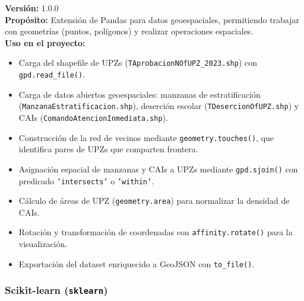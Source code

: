 \documentclass[12pt,a4paper]{article}
\begin{document}
\textbf{Versión:} 1.0.0\\
\textbf{Propósito:} Extensión de Pandas para datos geoespaciales, permitiendo trabajar con geometrías (puntos, polígonos) y realizar operaciones espaciales.\\
\textbf{Uso en el proyecto:}
\begin{itemize}
    \item Carga del shapefile de UPZs (\texttt{TAprobacionNOfUPZ\_2023.shp}) con \texttt{gpd.read\_file()}.
    \item Carga de datos abiertos geoespaciales: manzanas de estratificación (\texttt{ManzanaEstratificacion.shp}), deserción escolar (\texttt{TDesercionOfUPZ.shp}) y CAIs (\texttt{ComandoAtencionInmediata.shp}).
    \item Construcción de la red de vecinos mediante \texttt{geometry.touches()}, que identifica pares de UPZs que comparten frontera.
    \item Asignación espacial de manzanas y CAIs a UPZs mediante \texttt{gpd.sjoin()} con predicado \texttt{'intersects'} o \texttt{'within'}.
    \item Cálculo de áreas de UPZ (\texttt{geometry.area}) para normalizar la densidad de CAIs.
    \item Rotación y transformación de coordenadas con \texttt{affinity.rotate()} para la visualización.
    \item Exportación del dataset enriquecido a GeoJSON con \texttt{to\_file()}.
\end{itemize}

\subsubsection{Scikit-learn (\texttt{sklearn})}
\end{document}
